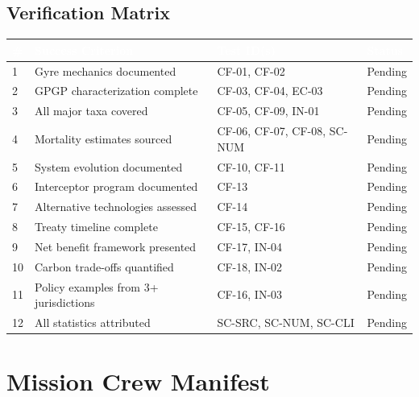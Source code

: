 \documentclass[11pt,letterpaper]{article}
\newcommand{\tableheader}[1]{\textbf{\sffamily\textcolor{white}{#1}}}
\begin{document}
\subsection{Verification Matrix}

\begin{center}
\small
\begin{tabularx}{\textwidth}{C{0.5cm}XL{3cm}C{1.5cm}}
\toprule
{}
\tableheader{\#} & \tableheader{Success Criterion} & \tableheader{Test ID(s)} & \tableheader{Status} \\
 & Gyre mechanics documented & CF-01, CF-02 & Pending \\
2 & GPGP characterization complete & CF-03, CF-04, EC-03 & Pending \\
3 & All major taxa covered & CF-05, CF-09, IN-01 & Pending \\
4 & Mortality estimates sourced & CF-06, CF-07, CF-08, SC-NUM & Pending \\
5 & System evolution documented & CF-10, CF-11 & Pending \\
6 & Interceptor program documented & CF-13 & Pending \\
7 & Alternative technologies assessed & CF-14 & Pending \\
8 & Treaty timeline complete & CF-15, CF-16 & Pending \\
9 & Net benefit framework presented & CF-17, IN-04 & Pending \\
10 & Carbon trade-offs quantified & CF-18, IN-02 & Pending \\
11 & Policy examples from 3+ jurisdictions & CF-16, IN-03 & Pending \\
12 & All statistics attributed & SC-SRC, SC-NUM, SC-CLI & Pending \\
\bottomrule
\end{tabularx}
\end{center}

\section{Mission Crew Manifest}
\end{document}

